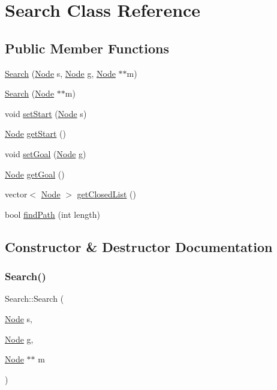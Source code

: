 \hypertarget{classSearch}{}\section{Search Class Reference}
\label{classSearch}
\subsection*{Public Member Functions}
\begin{DoxyCompactItemize}
\item 
\hyperlink{classSearch_a2998ad6a38a734499f2e1be4202b7fee}{Search} (\hyperlink{structNode}{Node} s, \hyperlink{structNode}{Node} g, \hyperlink{structNode}{Node} $\ast$$\ast$m)
\item 
\hyperlink{classSearch_aaac5fc9df8f0bf97f5344ee4c4f5486a}{Search} (\hyperlink{structNode}{Node} $\ast$$\ast$m)
\item 
void \hyperlink{classSearch_aac5b5b806c6283f2cc827ec14dac0ae3}{set\+Start} (\hyperlink{structNode}{Node} s)
\item 
\hyperlink{structNode}{Node} \hyperlink{classSearch_a4c59b1eff090896d91582d3cbe85c0f0}{get\+Start} ()
\item 
void \hyperlink{classSearch_adac3002d9754841372e39e249bc25981}{set\+Goal} (\hyperlink{structNode}{Node} g)
\item 
\hyperlink{structNode}{Node} \hyperlink{classSearch_a3a6f267df8e921ccb7feab65ad990948}{get\+Goal} ()
\item 
vector$<$ \hyperlink{structNode}{Node} $>$ \hyperlink{classSearch_a89084e77e24858c6edba6dd7b67b37ee}{get\+Closed\+List} ()
\item 
bool \hyperlink{classSearch_a603e51ec00f4667f7718a0670c61d9ba}{find\+Path} (int length)
\end{DoxyCompactItemize}


\subsection{Constructor \& Destructor Documentation}
\mbox{\label{classSearch_a2998ad6a38a734499f2e1be4202b7fee}} 
\subsubsection{\texorpdfstring{Search()}{Search()}\hspace{0.1cm}{\footnotesize\ttfamily [1/2]}}
{\footnotesize\ttfamily Search\+::\+Search (\begin{DoxyParamCaption}\item[{\hyperlink{structNode}{Node}}]{s,  }\item[{\hyperlink{structNode}{Node}}]{g,  }\item[{\hyperlink{structNode}{Node} $\ast$$\ast$}]{m }\end{DoxyParamCaption})\hspace{0.3cm}{\ttfamily [inline]}}

